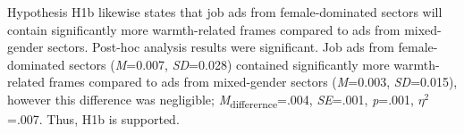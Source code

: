 \documentclass[Royal,sageapa,times]{sagej}
\begin{document}
\begin{table}[ht]
    \small\sf\centering
    \caption{\textit{Games-Howell post-hoc comparisons for gender-segregated sectors and warmth-related frames}}
    \label{table5}
    \vskip 4pt
    \end{table}

Hypothesis H1b likewise states that job ads from female-dominated sectors will contain significantly more warmth-related frames compared to ads from mixed-gender sectors. Post-hoc analysis results were significant. Job ads from female-dominated sectors (\textit{M}=0.007, \textit{SD}=0.028) contained significantly more warmth-related frames compared to ads from mixed-gender sectors (\textit{M}=0.003, \textit{SD}=0.015), however this difference was negligible; \textit{M}\textsubscript{differernce}=.004, \textit{SE}=.001, \textit{p}=.001, \textit{$\eta^2$}=.007. Thus, H1b is supported.
\end{document}
